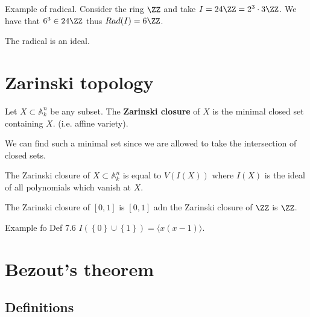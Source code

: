 \documentclass[12pt, a4paper]{article}
\renewcommand{\AA}{\mathbb A}
\begin{document}
\begin{example}
    Example of radical. Consider the ring \(\ZZ\) and take \(I = 24\ZZ = 2^3\cdot 3 \ZZ\). We have that \(6^3 \in 24\ZZ\) thus \(Rad(I)=6\ZZ\).
\end{example}

\begin{proposition}
    The radical is an ideal.
\end{proposition}

\section{Zarinski topology}

\begin{definition}
    Let \(X \subset \AA^n_k\) be any subset. The \textbf{Zarinski closure} of \(X\) is the minimal closed set containing \(X\). (i.e. affine variety).
\end{definition}

\begin{mdnote}
    We can find such a minimal set since we are allowed to take the intersection of closed sets.
\end{mdnote}

\begin{lemma}
    The Zarinski closure of \(X \subset \AA^n_k\) is equal to \(V(I(X))\) where \(I(X)\) is the ideal of all polynomials which vanish at \(X\).
\end{lemma}

\begin{example}
    The Zarinski closure of \([0,1]\) is \([0,1]\) adn the Zarinski closure of \(\ZZ\) is \(\ZZ\). 
\end{example}

\begin{example}
    Example fo Def 7.6 \(I(\left\{ 0 \right\} \cup \left\{ 1 \right\}) = \langle x(x-1) \rangle\).
\end{example}



\section{Bezout's theorem}

\subsection{Definitions}
\end{document}
